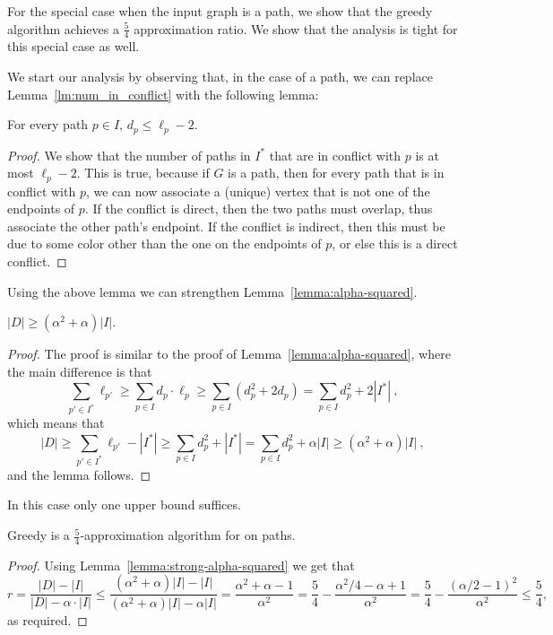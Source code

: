 For the special case when the input graph is a path, 
we show that the greedy algorithm achieves a $\frac{5}{4}$ approximation ratio.
We show that the analysis is tight for this special case as well.

We start our analysis  by observing that, in the case of a path, we can replace
Lemma~\ref{lm:num_in_conflict} with the following lemma:

\begin{lemma}
For every path $p \in I$, $d_p \leq \ell_p - 2$.
\end{lemma}
\begin{proof}
We show that the number of paths in $I^*$ that
are in conflict with $p$ is at most $\ell_p - 2$.  
This is true, because if $G$ is a  path, 
then for every path that is in conflict with $p$, 
we can now associate a (unique) vertex that is not one of the endpoints of $p$.  
If the conflict is direct, then the two paths
must overlap, thus associate the other path's endpoint.  If the
conflict is indirect, then this must be due to some color other than
the one on the endpoints of $p$, or else this is a direct conflict.
{}\end{proof}

Using the above lemma we can strengthen
Lemma~\ref{lemma:alpha-squared}.

\begin{lemma}
\label{lemma:strong-alpha-squared}
$|D| \geq (\alpha^2+\alpha)|I|$.
\end{lemma}
\begin{proof}
The proof is similar to the proof of Lemma~\ref{lemma:alpha-squared},
where the main difference is that
\[
\sum_{p' \in I^*} \ell_{p'}
\geq \sum_{p \in I} d_p \cdot \ell_p
\geq \sum_{p \in I} (d_p^2 + 2d_p)
=    \sum_{p \in I} d_p^2 + 2|I^*|
~,
\]
which means that 
\[
|D| 
\geq \sum_{p' \in I^*} \ell_{p'} - |I^*|
\geq \sum_{p \in I} d_p^2 + |I^*|
=    \sum_{p \in I} d_p^2 + \alpha |I|
\geq (\alpha^2 + \alpha) |I|
~,
\]
and the lemma follows.
{}\end{proof}

In this case only one upper bound suffices.

\begin{theorem}
Greedy is a $\frac{5}{4}$-approximation algorithm for
\TWOCR{} on paths.
\end{theorem}
\begin{proof}
Using Lemma~\ref{lemma:strong-alpha-squared} we get that
\[
r	=    
\frac{|D| - |I|}{|D| - \alpha \cdot |I|}
\leq 
\frac{
	(\alpha^2 + \alpha)|I| - |I|
}{
	(\alpha^2 + \alpha)|I| - \alpha |I|
}
=    \frac{\alpha^2 + \alpha - 1}{\alpha^2}
=    \frac{5}{4} - \frac{\alpha^2/4 - \alpha + 1}{\alpha^2}
=    \frac{5}{4} - \frac{(\alpha/2-1)^2}{\alpha^2}
\leq \frac{5}{4}
,
\]
as required.
{}\end{proof}

